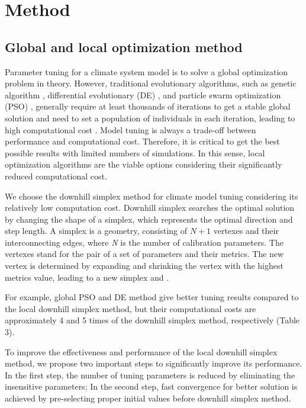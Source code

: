 \documentclass[gmd, manuscript]{copernicus}
\begin{document}
\section{Method}
\subsection{Global and local optimization method} 
Parameter tuning for a climate system model is to solve a global optimization problem in theory.  However, traditional evolutionary algorithms, such as genetic algorithm \citep{goldberg1989messy}, differential evolutionary (DE) \citep{storn1995differential}, and particle swarm optimization (PSO) \citep{kennedy2010particle}, generally require at least  thousands of iterations to get a stable global solution and need to set a population of individuals in each iteration, leading to high computational cost \citep{hegerty2009comparative,shi1999empirical}. Model tuning is always a trade-off between performance and computational cost. Therefore, it is critical to get the best possible results with limited numbers of simulations. In this sense, local optimization algorithms are the viable options  considering their significantly reduced computational cost.


We choose the downhill simplex method for climate model tuning considering its relatively low computation cost. Downhill simplex searches the optimal solution by changing the shape of a simplex, which represents the optimal direction and step length. A simplex is a geometry, consisting of $N+1$ vertexes and their interconnecting edges, where \textit{N} is the number of calibration parameters. The vertexes stand for the pair of a set of parameters and their metrics. The new vertex is determined by expanding and shrinking the vertex with the highest metrics value, leading to a new simplex \cite{press1992numerical} and \cite{nelder1965simplex}.


For example, global PSO and DE method give better tuning results compared to the local downhill simplex method, but their computational costs are approximately 4 and 5 times of the downhill simplex method, respectively (Table 3). 


To improve the effectiveness and performance of the local downhill simplex method, we propose two important steps to significantly improve its performance. In the first step, the number of tuning parameters is reduced by eliminating the insensitive parameters; In the second step, fast convergence for better solution is achieved by pre-selecting proper initial values before downhill simplex method.
\end{document}

